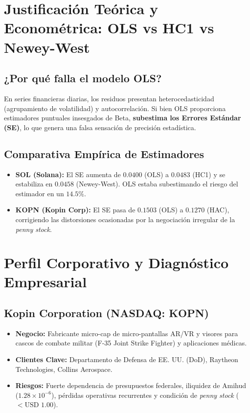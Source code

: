 \documentclass[11pt,a4paper]{article}
\begin{document}
\section{Justificación Teórica y Econométrica: OLS vs HC1 vs Newey-West}
\subsection{¿Por qué falla el modelo OLS?}
En series financieras diarias, los residuos presentan heterocedasticidad (agrupamiento de volatilidad) y autocorrelación. Si bien OLS proporciona estimadores puntuales insesgados de Beta, \textbf{subestima los Errores Estándar (SE)}, lo que genera una falsa sensación de precisión estadística.

\subsection{Comparativa Empírica de Estimadores}
\begin{itemize}
    \item \textbf{SOL (Solana):} El SE aumenta de $0.0400$ (OLS) a $0.0483$ (HC1) y se estabiliza en $0.0458$ (Newey-West). OLS estaba subestimando el riesgo del estimador en un $14.5\%$.
    \item \textbf{KOPN (Kopin Corp):} El SE pasa de $0.1503$ (OLS) a $0.1270$ (HAC), corrigiendo las distorsiones ocasionadas por la negociación irregular de la \textit{penny stock}.
\end{itemize}

\section{Perfil Corporativo y Diagnóstico Empresarial}
\subsection{Kopin Corporation (NASDAQ: KOPN)}
\begin{itemize}
    \item \textbf{Negocio:} Fabricante micro-cap de micro-pantallas AR/VR y visores para cascos de combate militar (F-35 Joint Strike Fighter) y aplicaciones médicas.
    \item \textbf{Clientes Clave:} Departamento de Defensa de EE. UU. (DoD), Raytheon Technologies, Collins Aerospace.
    \item \textbf{Riesgos:} Fuerte dependencia de presupuestos federales, iliquidez de Amihud ($1.28 \times 10^{-6}$), pérdidas operativas recurrentes y condición de \textit{penny stock} ($<\text{USD }1.00$).
\end{itemize}
\end{document}
